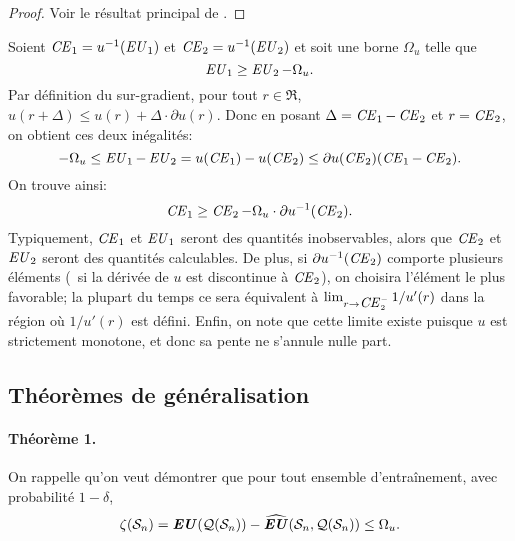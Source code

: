 \begin{proof}
  Voir le résultat principal de \cite{sridharan2009fast}.
\end{proof}


\begin{lemme}
  \label{lem:ce}
  Soient $\nCE_1 = u^{-1}(\nEU_1)$ et $\nCE_2 = u^{-1}(\nEU_2)$ et soit une borne $\Omega_u$ telle
  que
  \begin{equation}
    \nEU_1 \geq \nEU_2 - \Omega_u.
  \end{equation}
  Par définition du sur-gradient, pour tout $r \in \Re$,
  $u(r+\Delta) \leq u(r) + \Delta\cdot\partial u(r)$. Donc en posant
  $\Delta = \nCE_1 - \nCE_2$ et $r=\nCE_2$, on obtient ces deux inégalités:
  \begin{equation}
    -\Omega_u \leq \nEU_1 - \nEU_2 = u(\nCE_1) - u(\nCE_2) \leq \partial u(\nCE_2)(\nCE_1 - \nCE_2).
  \end{equation}
  On trouve ainsi:
  \begin{equation}
    \nCE_1 \geq \nCE_2 - \Omega_u\cdot \partial u^{-1}(\nCE_2).
  \end{equation}
  Typiquement, $\nCE_1$ et $\nEU_1$ seront des quantités inobservables, alors que $\nCE_2$
  et $\nEU_2$ seront des quantités calculables. De plus, si $\partial u^{-1}(\nCE_2)$ comporte
  plusieurs éléments (\eg\ si la dérivée de $u$ est discontinue à $\nCE_2$), on choisira
  l'élément le plus favorable; la plupart du temps ce sera équivalent à
  $\lim_{r\to\nCE_2^{-}}1/u'(r)$ dans la région où $1/u'(r)$ est défini. Enfin, on note que
  cette limite existe puisque $u$ est strictement monotone, et donc sa pente ne s'annule
  nulle part.
\end{lemme}


\subsection{Théorèmes de généralisation}
\label{sec:thm}

\paragraph{Théorème 1.} On rappelle qu'on veut démontrer que pour tout ensemble
d'entraînement, avec probabilité $1-\delta$, 
\begin{equation}
  \zeta(\S_n) = \EU(\alg(\S_n)) - \hEU(\S_n,\alg(\S_n)) \leq \Omega_u.
\end{equation}

